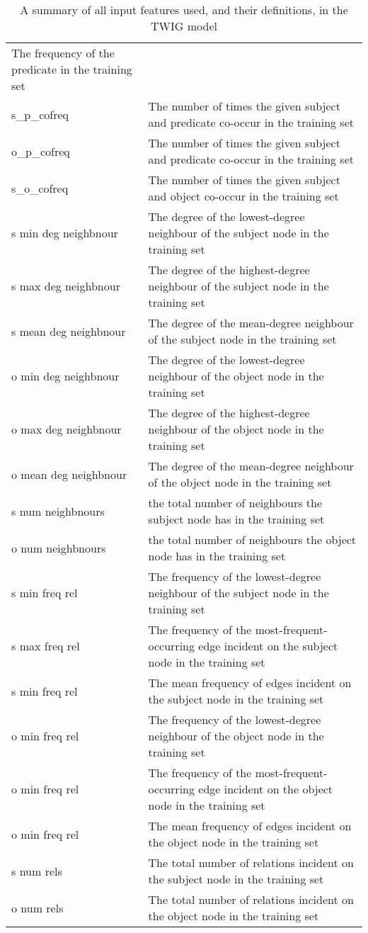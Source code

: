 \begin{table}
\begin{tabular}{p{3cm}|p{5cm}}
The frequency of the predicate in the training set\\
 s\_p\_cofreq&The number of times the given subject and predicate co-occur in the training set\\
 o\_p\_cofreq&The number of times the given subject and predicate co-occur in the training set \\
 s\_o\_cofreq&The number of times the given subject and object co-occur in the training set\\
 s min deg neighbnour&The degree of the lowest-degree neighbour of the subject node in the training set\\
 s max deg neighbnour&The degree of the highest-degree neighbour of the subject node in the training set\\
 s mean deg neighbnour&The degree of the mean-degree neighbour of the subject node in the training set\\
 o min deg neighbnour&The degree of the lowest-degree neighbour of the object node in the training set\\
 o max deg neighbnour&The degree of the highest-degree neighbour of the object node in the training set\\
 o mean deg neighbnour&The degree of the mean-degree neighbour of the object node in the training set\\
 s num neighbnours&the total number of neighbours the subject node has in the training set\\
 o num neighbnours&the total number of neighbours the object node has in the training set\\
 s min freq rel&The frequency of the lowest-degree neighbour of the subject node in the training set\\
 s max freq rel&The frequency of the most-frequent-occurring edge incident on the subject node in the training set\\
 s min freq rel&The mean frequency of edges incident on the subject node in the training set\\
 o min freq rel&The frequency of the lowest-degree neighbour of the object node in the training set\\
 o min freq rel&The frequency of the most-frequent-occurring edge incident on the object node in the training set\\
 o min freq rel&The mean frequency of edges incident on the object node in the training set\\
 s num rels&The total number of relations incident on the subject node in the training set\\
 o num rels&The total number of relations incident on the object node in the training set\\
    \end{tabular}
    \caption{A summary of all input features used, and their definitions, in the TWIG model}
    \label{tab:fts}
\end{table}

